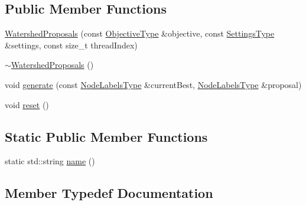 \subsection*{Public Member Functions}
\begin{DoxyCompactItemize}
\item 
\hyperlink{classnifty_1_1graph_1_1opt_1_1multicut_1_1WatershedProposals_a9d2d0702cfa98b669ebbb5ea2d4a1f07}{Watershed\+Proposals} (const \hyperlink{classnifty_1_1graph_1_1opt_1_1multicut_1_1WatershedProposals_a2ea604fcb16dc28bf52164ec5b3f232a}{Objective\+Type} \&objective, const \hyperlink{structnifty_1_1graph_1_1opt_1_1multicut_1_1WatershedProposals_1_1SettingsType}{Settings\+Type} \&settings, const size\+\_\+t thread\+Index)
\item 
\hyperlink{classnifty_1_1graph_1_1opt_1_1multicut_1_1WatershedProposals_ad66bba72cf18799a092676b354c252a5}{$\sim$\+Watershed\+Proposals} ()
\item 
void \hyperlink{classnifty_1_1graph_1_1opt_1_1multicut_1_1WatershedProposals_a8fdb72d28492ef820838d9b673af48ea}{generate} (const \hyperlink{classnifty_1_1graph_1_1opt_1_1multicut_1_1WatershedProposals_a41e2d6c837cbe4d58aa4279419483723}{Node\+Labels\+Type} \&current\+Best, \hyperlink{classnifty_1_1graph_1_1opt_1_1multicut_1_1WatershedProposals_a41e2d6c837cbe4d58aa4279419483723}{Node\+Labels\+Type} \&proposal)
\item 
void \hyperlink{classnifty_1_1graph_1_1opt_1_1multicut_1_1WatershedProposals_a4b51334351431bc1e232d52605580931}{reset} ()
\end{DoxyCompactItemize}
\subsection*{Static Public Member Functions}
\begin{DoxyCompactItemize}
\item 
static std\+::string \hyperlink{classnifty_1_1graph_1_1opt_1_1multicut_1_1WatershedProposals_a2fcdf9019b48369fe66806d87be937dc}{name} ()
\end{DoxyCompactItemize}


\subsection{Member Typedef Documentation}
\mbox{\label{classnifty_1_1graph_1_1opt_1_1multicut_1_1WatershedProposals_a5484630cc07bc37751c4262e40a059f8}} 
